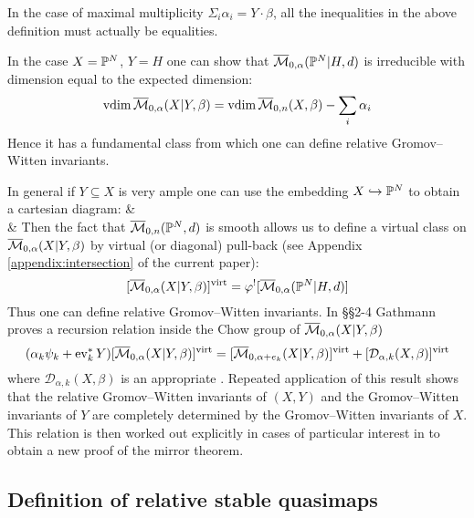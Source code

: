 \begin{remark} In the case of maximal multiplicity $\Sigma_{i} \alpha_i = Y \cdot \beta$, all the inequalities in the above definition must actually be equalities. \end{remark}

In the case $X=\mathbb P^N$, $Y=H$ one can show that $\overline{\mathcal M}_{0,\alpha}(\mathbb P^N|H,d)$ is irreducible with dimension equal to the expected dimension:
\begin{equation*} \operatorname{vdim} \overline{\mathcal M}_{0,\alpha}(X|Y,\beta) = \operatorname{vdim}{\overline{\mathcal M}_{0,n}(X,\beta)} - \sum_i \alpha_i \end{equation*}
Hence it has a fundamental class from which one can define relative Gromov--Witten invariants.

In general if $Y \subseteq X$ is very ample one can use the embedding $X \hookrightarrow \mathbb P^N$ to obtain a cartesian diagram:
\bcd
{} \ar[r] \ar[d]  &  \ar[d] \\
 \ar[r,"\varphi"] & 
\ecd
Then the fact that $\overline{\mathcal M}_{0,n}(\mathbb P^N,d)$ is smooth allows us to define a virtual class on $\overline{\mathcal M}_{0,\alpha}(X|Y,\beta)$ by virtual (or diagonal) pull-back (see Appendix \ref{appendix:intersection} of the current paper):
\begin{equation*} [\overline{\mathcal M}_{0,\alpha}(X|Y,\beta)]^{\operatorname{virt}} = \varphi^! [\overline{\mathcal M}_{0,\alpha}(\mathbb P^N|H,d)] \end{equation*}
Thus one can define relative Gromov--Witten invariants. In \S\S 2-4 Gathmann proves a recursion relation inside the Chow group of $\overline{\mathcal M}_{0,\alpha}(X|Y,\beta)$
\begin{equation*} (\alpha_k \psi_k + \operatorname{ev}_k^* Y) [\overline{\mathcal M}_{0,\alpha}(X|Y,\beta)]^{\operatorname{virt}} = [\overline{\mathcal M}_{0,\alpha+e_k}(X|Y,\beta)]^{\operatorname{virt}} + [\mathcal{D}_{\alpha,k}(X,\beta)]^{\operatorname{virt}} \end{equation*}
where $\mathcal{D}_{\alpha,k}(X,\beta)$ is an appropriate . Repeated application of this result shows that the relative Gromov--Witten invariants of $(X,Y)$ and the Gromov--Witten invariants of $Y$ are completely determined by the Gromov--Witten invariants of $X$. This relation is then worked out explicitly in cases of particular interest in \cite{Ga-MF} to obtain a new proof of the mirror theorem.

\subsection{Definition of relative stable quasimaps} \label{Subsection relative stable quasimaps}

